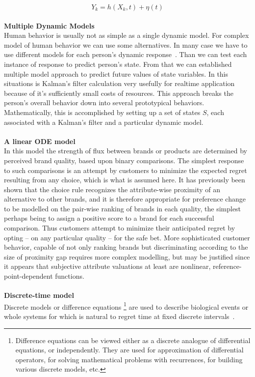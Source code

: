 \begin{equation} \label{eq:2}
Y_k = h(X_k, t) + \eta(t)
\end{equation}
\\
\textbf{Multiple Dynamic Models} \label{subsec:multipleDynamicModels}\\
Human behavior is usually not as simple as a single dynamic model.
For complex model of human behavior we can use some alternatives.
In many case we have to use different models for each person's dynamic response~\cite{wilsky}.
Than we can test each instance of response to predict person's state.
From that we can established multiple model approach to predict future values of state variables.
In this situations is Kalman's filter calculation very usefully for realtime application because of it's sufficiently small costs of resources.
This approach breaks the person's overall behavior down into several prototypical behaviors.~\cite{pantland}
Mathematically, this is accomplished by setting up a set of states $S$, each associated with a Kalman's filter and a particular dynamic model.\\
\\
\textbf{A linear ODE model} \label{subsec:ode}\\
In this model the strength of flux between brands or products are determined by perceived brand quality,
based upon binary comparisons.
The simplest response to such comparisons is an attempt by customers to minimize the expected regret resulting
from any choice, which is what is assumed here.
It has previously been shown that the choice rule recognizes the attribute-wise proximity of an alternative
to other brands, and it is therefore appropriate for preference change to be modelled on the pair-wise ranking
of brands in each quality, the simplest perhaps being to assign a positive score to a brand for each successful comparison.
Thus customers attempt to minimize their anticipated regret by opting – on any particular quality – for the safe bet.
More sophisticated customer behavior, capable of not only ranking brands but discriminating according to the size of proximity gap
requires more complex modelling, but may be justified since it appears that subjective attribute valuations at least are nonlinear,
reference-point-dependent functions.\\
\\
\textbf{Discrete-time model} \label{subsec:discrete}\\
Discrete models or difference equations \footnote{Difference equations can be viewed either as a discrete analogue of differential equations, or independently.
They are used for approximation of differential operators, for solving mathematical problems with recurrences, for building various discrete
models, etc.} are used to describe biological events or whole systems for which is natural to regret time at fixed discrete intervals~\cite{pantland}.

